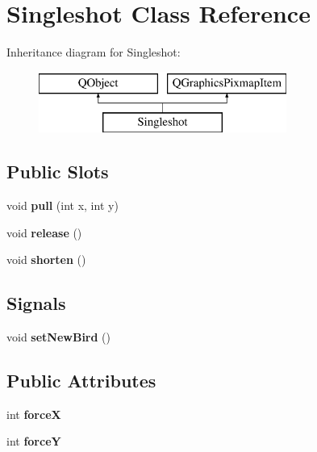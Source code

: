 \hypertarget{classSingleshot}{}\section{Singleshot Class Reference}
\label{classSingleshot}
Inheritance diagram for Singleshot\+:\begin{figure}[H]
\begin{center}
\leavevmode
\includegraphics[height=2.000000cm]{classSingleshot}
\end{center}
\end{figure}
\subsection*{Public Slots}
\begin{DoxyCompactItemize}
\item 
void {\bfseries pull} (int x, int y)\hypertarget{classSingleshot_a0e2327fe3007b5f49aa6c09487bee84b}{}\label{classSingleshot_a0e2327fe3007b5f49aa6c09487bee84b}

\item 
void {\bfseries release} ()\hypertarget{classSingleshot_a3ad5aebe0a5930a39a4a94ffdb0872ff}{}\label{classSingleshot_a3ad5aebe0a5930a39a4a94ffdb0872ff}

\item 
void {\bfseries shorten} ()\hypertarget{classSingleshot_aca3cd8fc37f38197739cef321bcac79e}{}\label{classSingleshot_aca3cd8fc37f38197739cef321bcac79e}

\end{DoxyCompactItemize}
\subsection*{Signals}
\begin{DoxyCompactItemize}
\item 
void {\bfseries set\+New\+Bird} ()\hypertarget{classSingleshot_ad2d8b5788491f362189447b037ba148b}{}\label{classSingleshot_ad2d8b5788491f362189447b037ba148b}

\end{DoxyCompactItemize}
\subsection*{Public Attributes}
\begin{DoxyCompactItemize}
\item 
int {\bfseries forceX}\hypertarget{classSingleshot_ac2c993af762810642fb9e14050b98ff6}{}\label{classSingleshot_ac2c993af762810642fb9e14050b98ff6}

\item 
int {\bfseries forceY}\hypertarget{classSingleshot_ac5015fd8605425657701bad124210fb6}{}\label{classSingleshot_ac5015fd8605425657701bad124210fb6}

\end{DoxyCompactItemize}
